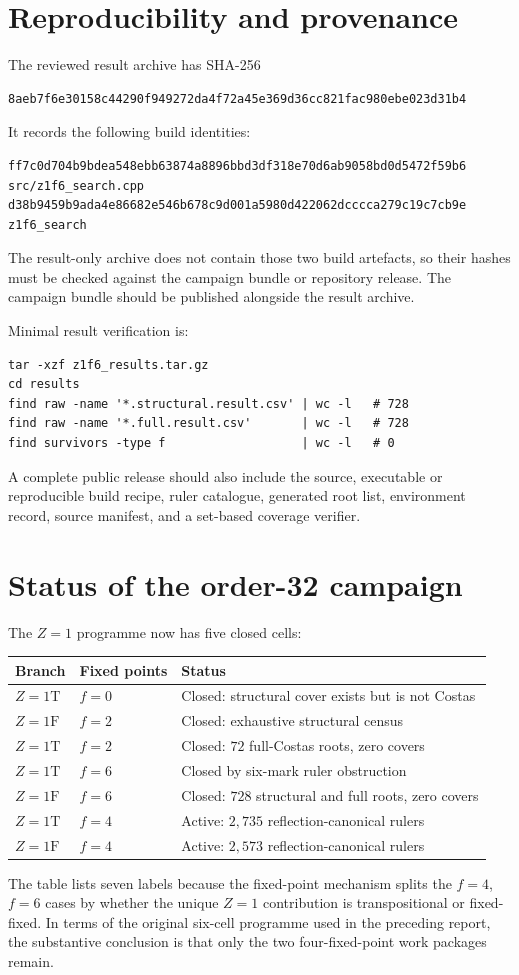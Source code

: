 \documentclass[11pt,a4paper]{article}
\begin{document}
\section{Reproducibility and provenance}
The reviewed result archive has SHA-256
\begin{verbatim}
8aeb7f6e30158c44290f949272da4f72a45e369d36cc821fac980ebe023d31b4
\end{verbatim}
It records the following build identities:
\begin{verbatim}
ff7c0d704b9bdea548ebb63874a8896bbd3df318e70d6ab9058bd0d5472f59b6  src/z1f6_search.cpp
d38b9459b9ada4e86682e546b678c9d001a5980d422062dcccca279c19c7cb9e  z1f6_search
\end{verbatim}
The result-only archive does not contain those two build artefacts, so their hashes must be checked against the campaign bundle or repository release. The campaign bundle should be published alongside the result archive.

Minimal result verification is:
\begin{verbatim}
tar -xzf z1f6_results.tar.gz
cd results
find raw -name '*.structural.result.csv' | wc -l   # 728
find raw -name '*.full.result.csv'       | wc -l   # 728
find survivors -type f                   | wc -l   # 0
\end{verbatim}
A complete public release should also include the source, executable or reproducible build recipe, ruler catalogue, generated root list, environment record, source manifest, and a set-based coverage verifier.

\section{Status of the order-32 campaign}
The $Z=1$ programme now has five closed cells:
\begin{longtable}{@{}lll@{}}\toprule
Branch & Fixed points & Status\\\midrule
$Z=1\mathrm T$ & $f=0$ & Closed: structural cover exists but is not Costas\\
$Z=1\mathrm F$ & $f=2$ & Closed: exhaustive structural census\\
$Z=1\mathrm T$ & $f=2$ & Closed: $72$ full-Costas roots, zero covers\\
$Z=1\mathrm T$ & $f=6$ & Closed by six-mark ruler obstruction\\
$Z=1\mathrm F$ & $f=6$ & Closed: $728$ structural and full roots, zero covers\\
$Z=1\mathrm T$ & $f=4$ & Active: $2{,}735$ reflection-canonical rulers\\
$Z=1\mathrm F$ & $f=4$ & Active: $2{,}573$ reflection-canonical rulers\\\bottomrule
\end{longtable}
The table lists seven labels because the fixed-point mechanism splits the $f=4$, $f=6$ cases by whether the unique $Z=1$ contribution is transpositional or fixed-fixed. In terms of the original six-cell programme used in the preceding report, the substantive conclusion is that only the two four-fixed-point work packages remain.
\end{document}

